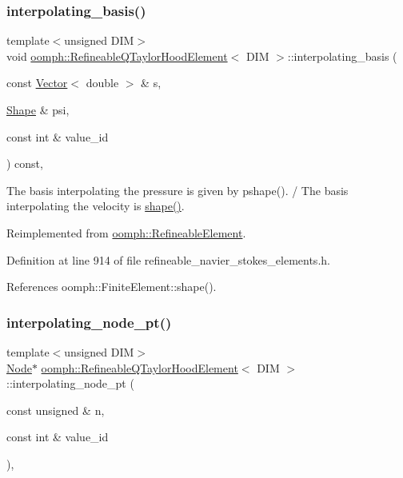\subsubsection{\texorpdfstring{interpolating\+\_\+basis()}{interpolating\_basis()}}
{\footnotesize\ttfamily template$<$unsigned D\+IM$>$ \\
void \hyperlink{classoomph_1_1RefineableQTaylorHoodElement}{oomph\+::\+Refineable\+Q\+Taylor\+Hood\+Element}$<$ D\+IM $>$\+::interpolating\+\_\+basis (\begin{DoxyParamCaption}\item[{const \hyperlink{classoomph_1_1Vector}{Vector}$<$ double $>$ \&}]{s,  }\item[{\hyperlink{classoomph_1_1Shape}{Shape} \&}]{psi,  }\item[{const int \&}]{value\+\_\+id }\end{DoxyParamCaption}) const\hspace{0.3cm}{\ttfamily [inline]}, {\ttfamily [virtual]}}



The basis interpolating the pressure is given by pshape(). / The basis interpolating the velocity is \hyperlink{classoomph_1_1FiniteElement_a58a25b6859ddd43b7bfe64a19fee5023}{shape()}. 



Reimplemented from \hyperlink{classoomph_1_1RefineableElement_a8ca420443c28708e5c6315a80f520137}{oomph\+::\+Refineable\+Element}.



Definition at line 914 of file refineable\+\_\+navier\+\_\+stokes\+\_\+elements.\+h.



References oomph\+::\+Finite\+Element\+::shape().

\mbox{\label{classoomph_1_1RefineableQTaylorHoodElement_a98cdc0f229459c09186a70731cd973d1}} 
\subsubsection{\texorpdfstring{interpolating\+\_\+node\+\_\+pt()}{interpolating\_node\_pt()}}
{\footnotesize\ttfamily template$<$unsigned D\+IM$>$ \\
\hyperlink{classoomph_1_1Node}{Node}$\ast$ \hyperlink{classoomph_1_1RefineableQTaylorHoodElement}{oomph\+::\+Refineable\+Q\+Taylor\+Hood\+Element}$<$ D\+IM $>$\+::interpolating\+\_\+node\+\_\+pt (\begin{DoxyParamCaption}\item[{const unsigned \&}]{n,  }\item[{const int \&}]{value\+\_\+id }\end{DoxyParamCaption})\hspace{0.3cm}{\ttfamily [inline]}, {\ttfamily [virtual]}}



